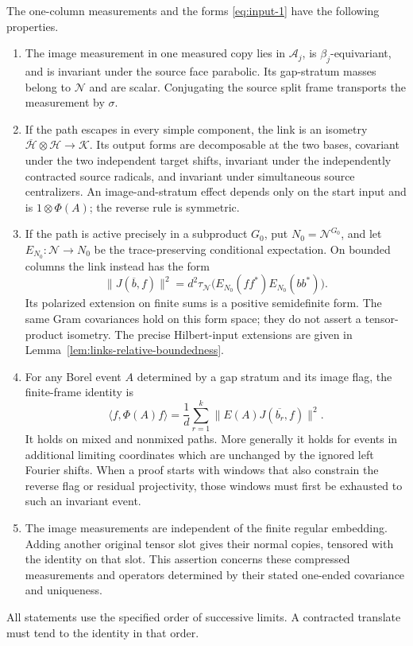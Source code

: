 \begin{proposition}
\label{prop:links-link}
The one-column measurements and the forms
\eqref{eq:input-1} have the following properties.
\begin{enumerate}[label=(\roman*)]
\item The image measurement in one measured copy lies in
\(\mathcal A_j\), is \(\beta_j\)-equivariant, and is invariant
under the source face parabolic. Its gap-stratum masses belong to
\(\mathcal N\) and are scalar. Conjugating the source split frame
transports the measurement by \(\sigma\).
\item If the path escapes in every simple component, the link is
an isometry
\(\overline{\mathcal H}\otimes\mathcal H\to\mathcal K\).
Its output forms are decomposable at the two bases, covariant under
the two independent target shifts, invariant under the independently
contracted source radicals, and invariant under simultaneous source
centralizers. An image-and-stratum effect depends only on the start
input and is \(1\otimes\Phi(A)\); the reverse rule is symmetric.
\item If the path is active precisely in a subproduct \(G_0\),
put \(N_0=\mathcal N^{G_0}\), and let
\(E_{N_0}:\mathcal N\to N_0\) be the trace-preserving conditional
expectation. On bounded columns the link instead has the form
\begin{equation}
 \|J(\overline b,f)\|^2
  =d^2\tau_{\mathcal N}
       \bigl(E_{N_0}(ff^*)E_{N_0}(bb^*)\bigr).
 \label{eq:links-relative-form}
\end{equation}
Its polarized extension on finite sums is a positive semidefinite
form. The same Gram covariances hold on this form space; they do
not assert a tensor-product isometry. The precise Hilbert-input
extensions are given in Lemma~\ref{lem:links-relative-boundedness}.
\item For any Borel event \(A\) determined by a gap stratum and
its image flag, the finite-frame identity is
\begin{equation}
 \langle f,\Phi(A)f\rangle
  =\frac1d\sum_{r=1}^k
       \|E(A)J(\overline{b_r},f)\|^2.
 \label{eq:links-frame}
\end{equation}
It holds on mixed and nonmixed paths. More generally it holds for
events in additional limiting coordinates which are unchanged by
the ignored left Fourier shifts. When a proof starts with windows
that also constrain the reverse flag or residual projectivity,
those windows must first be exhausted to such an invariant event.
\item The image measurements are independent of the finite regular
embedding. Adding another original tensor slot gives their normal
copies, tensored with the identity on that slot. This assertion
concerns these compressed measurements and operators determined by
their stated one-ended covariance and uniqueness.
\end{enumerate}
All statements use the specified order of successive limits. A
contracted translate must tend to the identity in that order.
\end{proposition}

